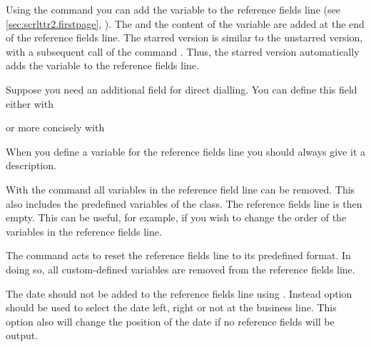 Using the command  you can add the variable 
to the reference fields line (see
\autoref{sec:scrlttr2.firstpage},
). The  and the
content of the variable are added at the end of the reference fields line. The
starred version  is similar to the unstarred version, with
a subsequent call of the command . Thus, the starred
version automatically adds the variable to the reference fields line.
\begin{Example}
  Suppose you need an additional field for direct dialling. You can
  define this field either with
\begin{lstcode}
\end{lstcode}
  or more concisely with
\begin{lstcode}
\end{lstcode}
\end{Example}
When you define a variable for the reference fields line
you should always give it a description.

With the command  all variables in the reference field
line can be removed. This also includes the predefined variables of the
class. The reference fields line is then empty. This can be useful, for
example, if you wish to change the order of the variables in the reference
fields line.

The command  acts to reset the reference
fields line to its predefined format. In doing so, all custom-defined
variables are removed from the reference fields line.

The date should not be added to the reference fields line
using . Instead option %
%
%
 should be used to select the date left,
right or not at the business line. This option also will change the position
of the date if no reference fields will be output.%
%
%
%
%
%
%
%

